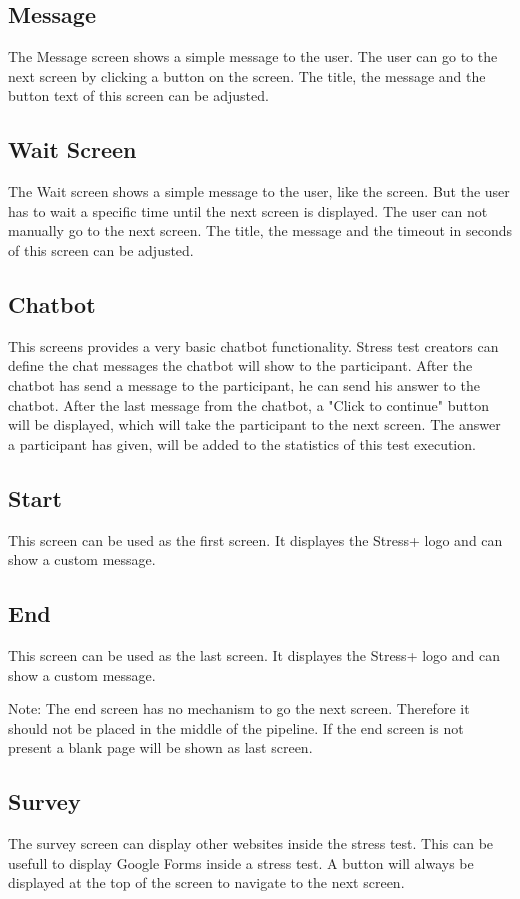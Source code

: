 \subsection{Message}
\label{sec:screens-message}
The Message screen shows a simple message to the user.
The user can go to the next screen by clicking a button on the screen.
The title, the message and the button text of this screen can be adjusted.

\subsection{Wait Screen}
\label{sec:screens-wait-screen}

The Wait screen shows a simple message to the user, like the  screen.
But the user has to wait a specific time until the next screen is displayed.
The user can not manually go to the next screen.
The title, the message and the timeout in seconds of this screen can be adjusted.

\subsection{Chatbot}
\label{sec:screens-chatbot}

This screens provides a very basic chatbot functionality.
Stress test creators can define the chat messages the chatbot will show to the participant.
After the chatbot has send a message to the participant, he can send his answer to the chatbot.
After the last message from the chatbot, a "Click to continue" button will be displayed, which will take the participant to the next screen.
The answer a participant has given, will be added to the statistics of this test execution.

\subsection{Start}
\label{sec:screens-start}

This screen can be used as the first screen.
It displayes the Stress+ logo and can show a custom message.

\subsection{End}
\label{sec:screens-end}

This screen can be used as the last screen.
It displayes the Stress+ logo and can show a custom message.

Note: The end screen has no mechanism to go the next screen. Therefore it should not be placed in the middle of the pipeline.
If the end screen is not present a blank page will be shown as last screen.

\subsection{Survey}
\label{sec:screens-survey}

The survey screen can display other websites inside the stress test. 
This can be usefull to display Google Forms inside a stress test.
A button will always be displayed at the top of the screen to navigate to the next screen.
